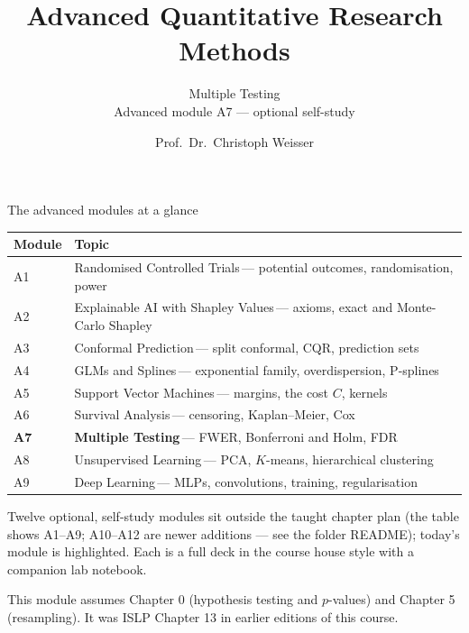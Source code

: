 \documentclass[aspectratio=169,11pt]{beamer}
\title{Advanced Quantitative Research Methods}
\subtitle{Multiple Testing\\[2pt]{\small Advanced module A7 --- optional self-study}}
\author{Prof.\ Dr.\ Christoph Weisser}
\date{}\graphicspath{{images/}}
\begin{document}
\begin{frame}[plain]\titlepage\end{frame}

\begin{frame}{The advanced modules at a glance}
  \vspace{-1.5mm}
  \begin{center}
  \scriptsize
  \setlength{\tabcolsep}{5pt}
  \renewcommand{\arraystretch}{1.30}
  \begin{tabular}{@{\hspace{2pt}}l >{\raggedright\arraybackslash}p{}@{\hspace{2pt}}}
    \toprule
    \textbf{Module} & \textbf{Topic} \\
    \midrule
     {\color{accent}A1} & Randomised Controlled Trials\,{\color{black!45}--- potential outcomes, randomisation, power} \\
    \rowcolor{black!3} {\color{accent}A2} & Explainable AI with Shapley Values\,{\color{black!45}--- axioms, exact and Monte-Carlo Shapley} \\
     {\color{accent}A3} & Conformal Prediction\,{\color{black!45}--- split conformal, CQR, prediction sets} \\
    \rowcolor{black!3} {\color{accent}A4} & GLMs and Splines\,{\color{black!45}--- exponential family, overdispersion, P-splines} \\
     {\color{accent}A5} & Support Vector Machines\,{\color{black!45}--- margins, the cost $C$, kernels} \\
    \rowcolor{black!3} {\color{accent}A6} & Survival Analysis\,{\color{black!45}--- censoring, Kaplan--Meier, Cox} \\
    \rowcolor{accent!18} \textbf{A7} & \textbf{Multiple Testing}\,{\color{accent!75!black}--- FWER, Bonferroni and Holm, FDR} \\
     {\color{accent}A8} & Unsupervised Learning\,{\color{black!45}--- PCA, $K$-means, hierarchical clustering} \\
    \rowcolor{black!3} {\color{accent}A9} & Deep Learning\,{\color{black!45}--- MLPs, convolutions, training, regularisation} \\
    \bottomrule
  \end{tabular}
  \end{center}
  \vspace{2mm}
  {\scriptsize Twelve optional, self-study modules sit outside the taught
  chapter plan (the table shows A1--A9; A10--A12 are newer additions --- see the folder README); today's module is highlighted. Each is a full deck in the course
  house style with a companion lab notebook.\par\medskip This module assumes Chapter 0 (hypothesis testing and $p$-values) and Chapter 5 (resampling). It was ISLP Chapter 13 in earlier editions of this course.}
\end{frame}
\end{document}
